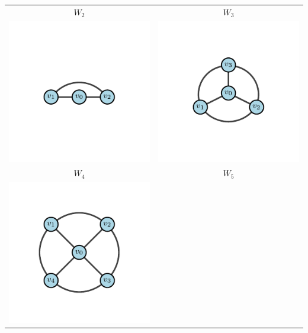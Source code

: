         \begin{table}[H]
            \begin{center}
                \begin{tabular}{cc}
                
                    \textbf{$W_2$} & \textbf{$W_3$}\\
                    \includegraphics{Sections/Graphs/GraphsImages/GraphsWn/W2.pdf}
                    \centering 
                    &
                    \includegraphics{Sections/Graphs/GraphsImages/GraphsWn/W3.pdf}
                    \\
                    \textbf{$W_4$} & \textbf{$W_5$} \\
                    \includegraphics{Sections/Graphs/GraphsImages/GraphsWn/W4.pdf}

\end{tabular}
\end{center}
\end{table}
